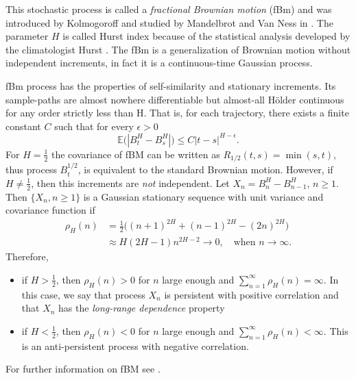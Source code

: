 \documentclass[smallextended]{svjour3}
\newcommand{\E}{\mathbb{E}}
\begin{document}
        This stochastic process is called a \emph{fractional Brownian motion}
    (fBm) and was introduced by Kolmogoroff \cite{ko} and studied by Mandelbrot
    and Van Ness in \cite{ma-va}. The parameter $H$ is called Hurst index
    because of the statistical analysis developed by the climatologist Hurst
    \cite{hu}. The fBm is a generalization of Brownian motion without
    independent increments, in fact it is a continuous-time Gaussian process.


        fBm process has the properties of self-similarity and stationary increments.
    Its sample-paths are almost nowhere differentiable but almost-all H\"{o}lder continuous 
    for any order strictly less than H. That is, for each
    trajectory, there exists a finite constant $C$ such that for every
    $\epsilon > 0$
    \[
        \E \big(
            | B_t ^ H - B_s ^ H|
        \big)
        \le
        C |t - s| ^ {H - \epsilon} .
    \]
%
        For $H = \tfrac{1}{2} $ the covariance of fBM can be written as
    $
        R_{1 / 2} (t, s)
            = \min(s, t)
    $, thus process $B_t ^ {1 / 2}$, is equivalent to
    the standard Brownian motion. However, if $H \ne \tfrac{1}{2}$, 
    then this increments are \emph{not} independent.
%
    	Let  $X_n = B_n ^ H - B_{n - 1} ^ H$, $n \ge 1$.
    Then $\{X_n, n \ge 1\}$ is a Gaussian stationary sequence with unit
    variance and covariance function if
    \begin{align*}
        \rho_H (n) &=
            \frac{1}{2}
            \Big(
                (n + 1) ^ {2 H} + (n - 1) ^ {2 H}
                - (2 n) ^{2 H}
            \Big)
            \\
            &\approx
            H (2H - 1)n^{2H-2} \to 0, \quad \text{when }
        n \to \infty.
    \end{align*}
Therefore,
\begin{itemize}
    \item
        if $H > \tfrac{1}{2}$, then $\rho_H(n) > 0$ for $n$ large enough and
        $\sum_{n=1}^\infty \rho_H(n)=\infty$. In this case, we say that
        process $X_n$ is persistent with positive correlation and that
        $X_n$ has the \emph{ long-range dependence} property

    \item
        if $H < \tfrac{1}{2}$, then $\rho_H(n) < 0$ for $n$ large enough and
        $\sum_{n=1}^\infty \rho_H(n)<\infty$.
        This is an anti-persistent process with negative correlation.
\end{itemize}
    For further information on fBM see \cite{ra,nu,mi}.
\end{document}
